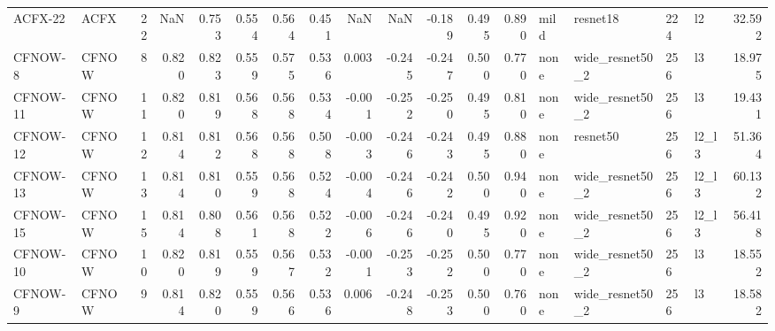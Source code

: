 \begin{tabular}{llrrrrrrrrrrrllllr}
  ACFX-22 &   ACFX &     22 &              NaN &         0.753 &        0.554 &                   0.564 &       0.451 &                 NaN &            NaN &            -0.189 &          0.495 &              0.890 &       mild &        resnet18 &        224 &     l2 &       32.592 \\
  CFNOW-8 &  CFNOW &      8 &            0.820 &         0.823 &        0.559 &                   0.575 &       0.536 &               0.003 &         -0.245 &            -0.247 &          0.500 &              0.770 &       none & wide\_resnet50\_2 &        256 &     l3 &       18.975 \\
 CFNOW-11 &  CFNOW &     11 &            0.820 &         0.819 &        0.568 &                   0.568 &       0.534 &              -0.001 &         -0.252 &            -0.250 &          0.495 &              0.810 &       none & wide\_resnet50\_2 &        256 &     l3 &       19.431 \\
 CFNOW-12 &  CFNOW &     12 &            0.814 &         0.812 &        0.568 &                   0.568 &       0.508 &              -0.003 &         -0.246 &            -0.243 &          0.495 &              0.880 &       none &        resnet50 &        256 &  l2\_l3 &       51.364 \\
 CFNOW-13 &  CFNOW &     13 &            0.814 &         0.810 &        0.559 &                   0.568 &       0.524 &              -0.004 &         -0.246 &            -0.242 &          0.500 &              0.940 &       none & wide\_resnet50\_2 &        256 &  l2\_l3 &       60.132 \\
 CFNOW-15 &  CFNOW &     15 &            0.814 &         0.808 &        0.561 &                   0.568 &       0.522 &              -0.006 &         -0.246 &            -0.240 &          0.495 &              0.920 &       none & wide\_resnet50\_2 &        256 &  l2\_l3 &       56.418 \\
 CFNOW-10 &  CFNOW &     10 &            0.820 &         0.819 &        0.559 &                   0.567 &       0.532 &              -0.001 &         -0.253 &            -0.252 &          0.500 &              0.770 &       none & wide\_resnet50\_2 &        256 &     l3 &       18.552 \\
  CFNOW-9 &  CFNOW &      9 &            0.814 &         0.820 &        0.559 &                   0.566 &       0.536 &               0.006 &         -0.248 &            -0.253 &          0.500 &              0.760 &       none & wide\_resnet50\_2 &        256 &     l3 &       18.582 \\

\end{tabular}
